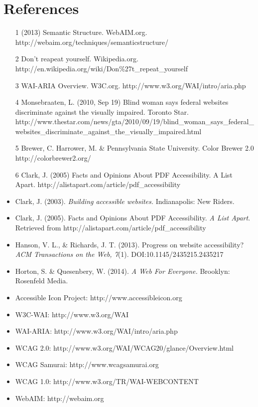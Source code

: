 \documentclass{acm_proc_article-sp}
\begin{document}
\section{References}
\begin{itemize}
\item[1] (2013) Semantic Structure. WebAIM.org. http://webaim.org/techniques/semanticstructure/
\item[2] Don't reapeat yourself. Wikipedia.org. http://en.wikipedia.org/wiki/Don\%27t\_repeat\_yourself
\item[3] WAI-ARIA Overview. W3C.org. http://www.w3.org/WAI/intro/aria.php
\item[4] Monsebraaten, L. (2010, Sep 19) Blind woman says federal websites discriminate against the visually
impaired. Toronto Star.
http://www.thestar.com/news/gta/2010/09/19/blind\_woman\_says\_federal\_websites\_discriminate\_against\_the\_visually\_impaired.html
\item[5] Brewer, C. Harrower, M. \& Pennsylvania State University. Color Brewer 2.0 http://colorbrewer2.org/
\item[6] Clark, J. (2005) Facts and Opinions About PDF Accessibility. A List Apart.
http://alistapart.com/article/pdf\_accessibility
\item Clark, J. (2003). {\it Building accessible websites.} Indianapolis: New Riders.
\item Clark, J. (2005). Facts and Opinions About PDF Accessibility. {\it A List Apart}. Retrieved from http://alistapart.com/article/pdf\_accessibility
\item Hanson, V. L., \& Richards, J. T. (2013). Progress on website accessibility? {\it ACM Transactions on the Web, 7}(1). DOI:10.1145/2435215.2435217
\item Horton, S. \& Quesenbery, W. (2014). {\it A Web For Everyone.} Brooklyn: Rosenfeld Media.
\item Accessible Icon Project: http://www.accessibleicon.org
\item W3C-WAI: http://www.w3.org/WAI
\item WAI-ARIA: http://www.w3.org/WAI/intro/aria.php
\item WCAG 2.0: http://www.w3.org/WAI/WCAG20/glance/Overview.html
\item WCAG Samurai: http://www.wcagsamurai.org
\item WCAG 1.0: http://www.w3.org/TR/WAI-WEBCONTENT
\item WebAIM: http://webaim.org		
\end{itemize}
%
\end{document}
